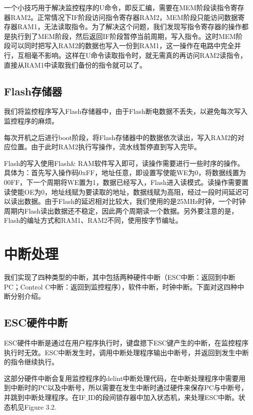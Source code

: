 一个小技巧用于解决监控程序的U命令，即反汇编，需要在MEM阶段读指令寄存器RAM2。正常情况下IF阶段访问指令寄存器RAM2，MEM阶段只能访问数据寄存器RAM1，无法读取指令。为了解决这个问题，我们发现写指令寄存器的操作都是执行到了MEM阶段，然后返回IF阶段暂停当前周期，写入指令。这时MEM阶段可以同时把写入RAM2的数据也写入一份到RAM1，这一操作在电路中完全并行，互相毫不影响。这样在U命令读取指令时，就无需真的再访问RAM2读指令，直接从RAM1中读取我们备份的指令就可以了。

\subsection{Flash存储器}
我们将监控程序写入Flash存储器中，由于Flash断电数据不丢失，以避免每次写入监控程序的麻烦。

每次开机之后进行boot阶段，将Flash存储器中的数据依次读出，写入RAM2的对应位置。由于此时RAM2执行写操作，流水线暂停直到写入完毕。

Flash的写入使用Flash\& RAM软件写入即可，读操作需要进行一些时序的操作。具体为：首先写入操作码0xFF，地址任意，即设置写使能WE为0，将数据线置为00FF，下一个周期将WE置为1，数据已经写入，Flash进入读模式。读操作需要置读使能OE为0，地址线赋为要读取的地址，数据线赋为高阻，经过一段时间延迟可以读出数据。由于Flash的延迟相对比较大，我们使用的是25MHz时钟，一个时钟周期内Flash读出数据还不稳定，因此两个周期读一个数据。另外要注意的是，Flash的编址方式和RAM1、RAM2不同，使用按字节编址。



\section{中断处理}

我们实现了四种类型的中断，其中包括两种硬件中断（ESC中断：返回到中断PC；Control C中断：返回到监控程序），软件中断，时钟中断。下面对这四种中断分别介绍。

\subsection{ESC硬件中断}

ESC硬件中断是通过在用户程序执行时，键盘摁下ESC键产生的中断，在监控程序执行时无效。ESC中断发生时，调用中断处理程序输出中断号，并返回到发生中断的指令继续执行。

这部分硬件中断会复用监控程序的delint中断处理代码，在中断处理程序中需要用到中断时的PC以及中断号，所以需要在发生中断时通过硬件来保存PC与中断号，并跳到中断处理程序。在IF$\_$ID的段间锁存器中加入状态机，来处理ESC中断。状态机见Figure 3.2.

